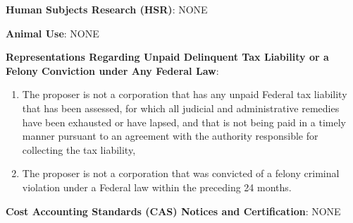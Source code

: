 \noindent
\textbf{Human Subjects Research (HSR)}: NONE

\vspace{1ex}

\noindent
\textbf{Animal Use}: NONE

\vspace{1ex}

\noindent
\textbf{Representations Regarding Unpaid Delinquent Tax Liability or a Felony
Conviction under Any Federal Law}: 

\begin{enumerate}
\item
The proposer is  not a corporation that has any unpaid Federal tax liability that has been assessed, for which all judicial and administrative remedies have been exhausted or have lapsed, and that is not being paid in a timely manner pursuant to an agreement with the authority responsible for collecting the tax liability,
\item
The proposer is not a corporation that was convicted of a felony criminal violation under a Federal law within the preceding 24 months.
\end{enumerate}

\vspace{1ex}

\noindent
\textbf{Cost Accounting Standards (CAS) Notices and Certification}:
NONE
